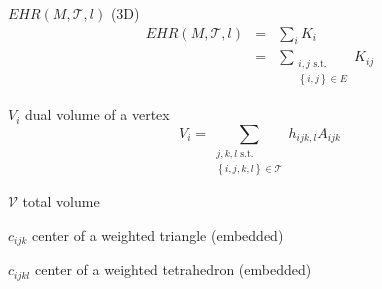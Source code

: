 \documentclass{article}
\begin{document}
$EHR\left( M,\mathcal{T},l\right) $ (3D)%
\begin{eqnarray*}
EHR\left( M,\mathcal{T},l\right)  &=&\sum_{i}K_{i} \\
&=&\sum_{\substack{ i,j\text{ s.t.} \\ \left\{ i,j\right\} \in E}}K_{ij}
\end{eqnarray*}

$V_{i}$ dual volume of a vertex%
\[
V_{i}=\sum_{\substack{ j,k,l\text{ s.t.} \\ \left\{ i,j,k,l\right\} \in 
\mathcal{T}}}h_{ijk,l}A_{ijk}
\]

$\mathcal{V}$ total volume

$c_{ijk}$ center of a weighted triangle (embedded)

$c_{ijkl}$ center of a weighted tetrahedron (embedded)
\end{document}
